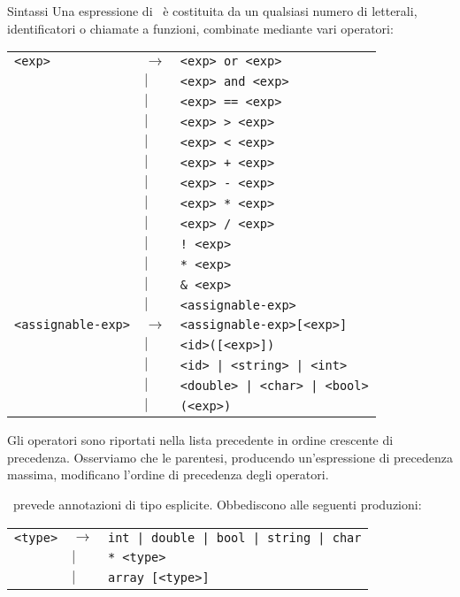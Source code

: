 \begin{section}{Sintassi}
	Una espressione di \ME \ \`e costituita da un qualsiasi numero di
	letterali, identificatori o chiamate a funzioni, combinate
	mediante vari operatori:

	\begin{center} \begin{tabular} {lll}
		\texttt{<exp>} & $\rightarrow$ & \texttt{<exp> or <exp>} \\
		& $|$ & \texttt{<exp> and <exp>} \\
		& $|$ & \texttt{<exp> == <exp>} \\
		& $|$ & \texttt{<exp> > <exp>} \\
		& $|$ & \texttt{<exp> < <exp>} \\
		& $|$ & \texttt{<exp> + <exp>} \\
		& $|$ & \texttt{<exp> - <exp>} \\
		& $|$ & \texttt{<exp> * <exp>} \\
		& $|$ & \texttt{<exp> / <exp>} \\
		& $|$ & \texttt{! <exp>} \\
		& $|$ & \texttt{* <exp>} \\
		& $|$ & \texttt{\& <exp>} \\
		& $|$ & \texttt{<assignable-exp>} \\
		\texttt{<assignable-exp>} & $\rightarrow$ &
			\texttt{<assignable-exp>[<exp>]} \\
		& $|$ & \texttt{<id>([<exp>])} \\
		& $|$ & \texttt{<id> | <string> | <int>} \\
		& $|$ & \texttt{<double> | <char> | <bool>} \\
		& $|$ & \texttt{(<exp>)} \\
	\end{tabular} \end{center}

	Gli operatori sono riportati nella lista precedente in ordine
	crescente di precedenza. Osserviamo che le parentesi, producendo
	un'espressione di precedenza massima, modificano l'ordine di
	precedenza degli operatori.

	\ME \ prevede annotazioni di tipo esplicite. Obbediscono alle
	seguenti produzioni:

	\begin{center} \begin{tabular} {lll}
		\texttt{<type>} & $\rightarrow$ & 
			\texttt{int | double | bool | string | char} \\
		& $|$ & \texttt{* <type>} \\
		& $|$ & \texttt{array [<type>]} \\
	\end{tabular} \end{center}


\end{section}
